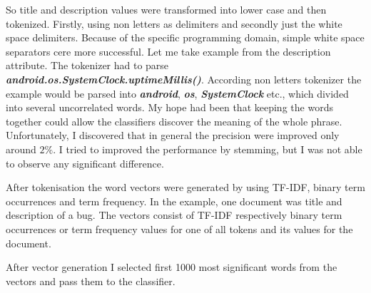 So title and description values were transformed into lower case
and then tokenized. Firstly, using non letters as delimiters and
secondly just the white space delimiters. Because of the
specific programming domain, simple white space separators cere
more successful. Let me take example from the description
attribute. The tokenizer had to parse {\bf {\it
android.os.SystemClock.uptimeMillis()}}. According non letters
tokenizer the example would be parsed into {\bf {\it android}},
{\bf {\it os}}, {\bf {\it SystemClock}} etc., which divided into
several uncorrelated words. My hope had been that keeping the
words together could allow the classifiers discover the meaning
of the whole phrase. Unfortunately, I discovered that in general
the precision were improved only around $2\%$. I tried to
improved the performance by stemming, but I was not able to
observe any significant difference.

After tokenisation the word vectors were generated by using TF-IDF, binary term occurrences and term frequency.
In the example, one document was title and description of a bug.
The vectors consist of TF-IDF respectively binary term occurrences or term frequency values for one of all tokens and its values for the document.

After vector generation I selected first 1000 most significant words from the vectors and pass them to the classifier.

